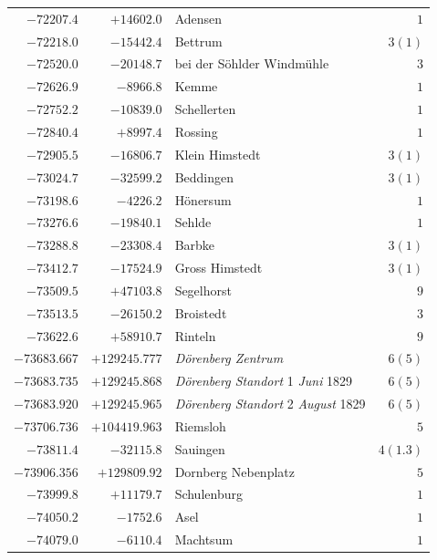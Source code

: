\begin{center}
\begin{tabular}{r|r|p{170pt}|r}
\(-72207.4\)&\(+14602.0\)&Adensen&\(1\)\\
\(-72218.0\)&\(-15442.4\)&Bettrum&\(3 (1)\)\\
\(-72520.0\)&\(-20148.7\)&bei der Söhlder Windmühle&\(3\)\\
\(-72626.9\)&\(-8966.8\)&Kemme&\(1\)\\
\(-72752.2\)&\(-10839.0\)&Schellerten&\(1\)\\
\(-72840.4\)&\(+8997.4\)&Rossing&\(1\)\\
\(-72905.5\)&\(-16806.7\)&Klein Himstedt&\(3 (1)\)\\
\(-73024.7\)&\(-32599.2\)&Beddingen&\(3 (1)\)\\
\(-73198.6\)&\(-4226.2\)&Hönersum&\(1\)\\
\(-73276.6\)&\(-19840.1\)&Sehlde&\(1\)\\
\(-73288.8\)&\(-23308.4\)&Barbke&\(3 (1)\)\\
\(-73412.7\)&\(-17524.9\)&Gross Himstedt&\(3 (1)\)\\
\(-73509.5\)&\(+47103.8\)&Segelhorst&\(9\)\\
\(-73513.5\)&\(-26150.2\)&Broistedt&\(3\)\\
\(-73622.6\)&\(+58910.7\)&Rinteln&\(9\)\\
\(-73683.667\)&\(+129245.777\)&\textit{Dörenberg Zentrum}&\(6 (5)\)\\
\(-73683.735\)&\(+129245.868\)&\textit{Dörenberg Standort} 1 \textit{Juni} 1829&\(6 (5)\)\\
\(-73683.920\)&\(+129245.965\)&\textit{Dörenberg Standort} 2 \textit{August} 1829&\(6 (5)\)\\
\(-73706.736\)&\(+104419.963\)&Riemsloh&\(5\)\\
\(-73811.4\)&\(-32115.8\)&Sauingen&\(4(1.3)\)\\
\(-73906.356\)&\(+129809.92\)&Dornberg Nebenplatz&\(5\)\\
\(-73999.8\)&\(+11179.7\)&Schulenburg&\(1\)\\
\(-74050.2\)&\(-1752.6\)&Asel&\(1\)\\
\(-74079.0\)&\(-6110.4\)&Machtsum&\(1\)\\
\hline\end{tabular}\endgroup\end{center}

